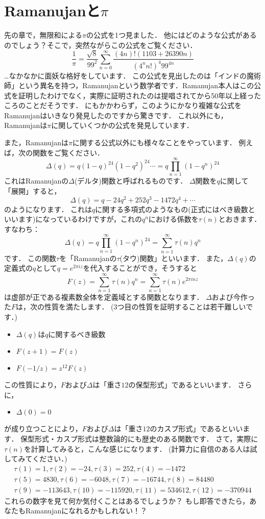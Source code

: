 \section{Ramanujanと$\pi$}
先の章で，無限和による$\pi$の公式を1つ見ました．
他にはどのような公式があるのでしょう？そこで，突然ながらこの公式をご覧ください．
\[
\frac{1}{\pi}=\frac{\sqrt{8}}{99^2} \sum_{n=0}^{\infty}\frac{(4n)! (1103+26390n)}{(4^{n}n!)^{4}99^{4n}}
\]
…なかなかに面妖な格好をしています．
この公式を見出したのは「インドの魔術師」という異名を持つ，Ramanujanという数学者です．Ramanujan本人はこの公式を証明したわけでなく，実際に証明されたのは提唱されてから50年以上経ったころのことだそうです．
にもかかわらず，このようにかなり複雑な公式をRamanujanはいきなり発見したのですから驚きです．
これ以外にも，Ramanujanは$\pi$に関していくつかの公式を発見しています．

また，Ramanujanは$\pi$に関する公式以外にも様々なことをやっています．
例えば，次の関数をご覧ください．
\[
  \Delta (q)=q(1-q)^{24}(1-q^{2})^{24} \cdots = q\prod_{n=1}^{\infty}(1-q^n)^{24}
\]
これはRamanujanの$\Delta$(デルタ)関数と呼ばれるものです．
$\Delta$関数を$q$に関して「展開」すると，
\[
	\Delta (q)=q-24q^{2}+252q^{3}-1472q^{4}+\cdots
\]
のようになります．
これは$q$に関する多項式のようなもの(正式にはべき級数といいます)になっているわけですが，これの$q^n$における係数を$\tau (n)$とおきます．
すなわち：
\[
	\Delta (q)=q\prod_{n=1}^{\infty}(1-q^n)^{24} = \sum_{n=1}^{\infty} \tau (n) q^{n}
\]
です．
この関数$\tau$を「Ramanujanの$\tau$(タウ)関数」といいます．
また，$\Delta(q)$の定義式の$q$として$q=e^{2\pi iz}$を代入することができ，そうすると
\[
	F(z)=\sum_{n=1}^{\infty} \tau (n) q^{n}=\sum_{n=1}^{\infty} \tau (n) e^{2 \pi inz}
\]
は虚部が正である複素数全体を定義域とする関数となります．
$\Delta$および今作った$F$は，次の性質を満たします．
(3つ目の性質を証明することは若干難しいです．)
\begin{itemize}
	\item $\Delta (q)$は$q$に関するべき級数
	\item $F(z+1)=F(z)$
	\item $F(-1/z)=z^{12} F(z)$
\end{itemize}
この性質により，$F$および$\Delta$は「重さ$12$の保型形式」であるといいます．
さらに，
\begin{itemize}
	\item $\Delta(0)=0$
\end{itemize}
が成り立つことにより，$F$および$\Delta$は「重さ$12$のカスプ形式」であるといいます．
保型形式・カスプ形式は整数論的にも歴史のある関数です．
さて，実際に$\tau (n)$を計算してみると，こんな感じになります．
(計算力に自信のある人は試してみてください．)
\begin{gather*}
\tau(1)=1, \tau(2)=-24, \tau(3)=252, \tau(4)=-1472 \\
\tau (5)=4830, \tau(6)=-6048, \tau(7)=-16744, \tau(8)=84480 \\
\tau(9)=-113643, \tau(10)=-115920, \tau(11)=534612, \tau(12)=-370944
\end{gather*}
これらの数字を見て何か気付くことはあるでしょうか？
もし即答できたら，あなたもRamanujanになれるかもしれない！？

